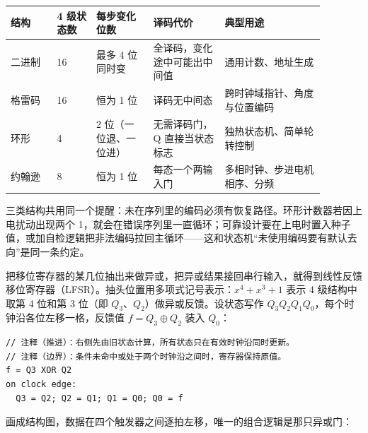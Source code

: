 \begin{longtable}{L{0.13\linewidth}L{0.11\linewidth}L{0.16\linewidth}L{0.20\linewidth}L{0.28\linewidth}}
\toprule
结构 & 4 级状态数 & 每步变化位数 & 译码代价 & 典型用途 \\
\midrule
二进制 & 16 & 最多 4 位同时变 & 全译码，变化途中可能出中间值 & 通用计数、地址生成 \\\tablerowrule
格雷码 & 16 & 恒为 1 位 & 译码无中间态 & 跨时钟域指针、角度与位置编码 \\\tablerowrule
环形 & 4 & 2 位（一位退、一位进） & 无需译码门，Q 直接当状态标志 & 独热状态机、简单轮转控制 \\\tablerowrule
约翰逊 & 8 & 恒为 1 位 & 每态一个两输入门 & 多相时钟、步进电机相序、分频 \\
\bottomrule
\end{longtable}

三类结构共用同一个提醒：未在序列里的编码必须有恢复路径。环形计数器若因上电扰动出现两个 1，就会在错误序列里一直循环；可靠设计要在上电时置入种子值，或加自检逻辑把非法编码拉回主循环——这和状态机“未使用编码要有默认去向”是同一条约定。


把移位寄存器的某几位抽出来做异或，把异或结果接回串行输入，就得到线性反馈移位寄存器（LFSR）。抽头位置用多项式记号表示：$x^4+x^3+1$ 表示 4 级结构中取第 4 位和第 3 位（即 $Q_3$、$Q_2$）做异或反馈。设状态写作 $Q_3Q_2Q_1Q_0$，每个时钟沿各位左移一格，反馈值 $f=Q_3\oplus Q_2$ 装入 $Q_0$：

\begin{lstlisting}
// 注释（推进）：右侧先由旧状态计算，所有状态只在有效时钟沿同时更新。
// 注释（边界）：条件未命中或处于两个时钟沿之间时，寄存器保持原值。
f = Q3 XOR Q2
on clock edge:
  Q3 = Q2; Q2 = Q1; Q1 = Q0; Q0 = f
\end{lstlisting}

画成结构图，数据在四个触发器之间逐拍左移，唯一的组合逻辑是那只异或门：

